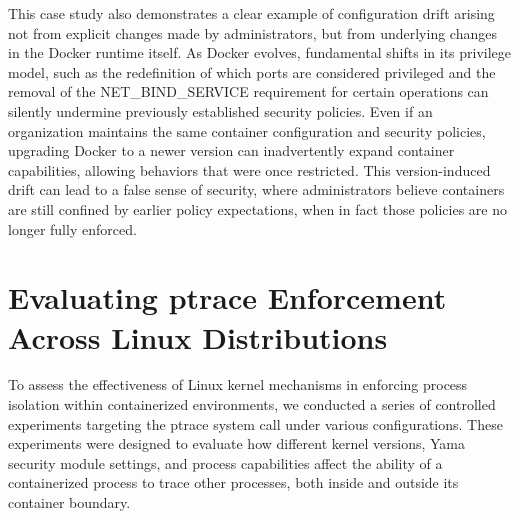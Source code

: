 \documentclass[12pt]{report}
\begin{document}
\begin{doublespace}
This case study also demonstrates a clear example of configuration drift arising not from explicit changes made by administrators, but from underlying changes in the Docker runtime itself. As Docker evolves, fundamental shifts in its privilege model, such as the redefinition of which ports are considered privileged and the removal of the NET\_BIND\_SERVICE requirement for certain operations can silently undermine previously established security policies. Even if an organization maintains the same container configuration and security policies, upgrading Docker to a newer version can inadvertently expand container capabilities, allowing behaviors that were once restricted. This version-induced drift can lead to a false sense of security, where administrators believe containers are still confined by earlier policy expectations, when in fact those policies are no longer fully enforced.



















































\section{Evaluating ptrace Enforcement Across Linux Distributions}
\label{sec:evaluating-ptrace-enforcement-across-linux-distributions}

To assess the effectiveness of Linux kernel mechanisms in enforcing process isolation within containerized environments, we conducted a series of controlled experiments targeting the ptrace system call under various configurations. These experiments were designed to evaluate how different kernel versions, Yama security module settings, and process capabilities affect the ability of a containerized process to trace other processes, both inside and outside its container boundary.


\end{doublespace}
\end{document}
